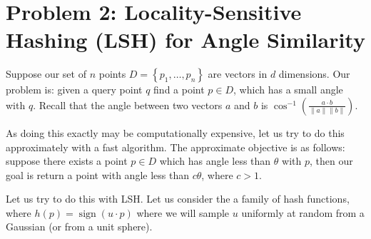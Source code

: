 \section*{Problem 2: Locality-Sensitive Hashing (LSH) for Angle Similarity}

Suppose our set of $n$ points $D = \left\{p_1,\ldots,p_n\right\}$ are vectors in
$d$ dimensions. Our problem is: given a query point $q$ find a point $p \in D$,
which has a small angle with $q$. Recall that the angle between two vectors $a$
and $b$ is
$\cos^{-1}\left(\frac{a \cdot b}{\lVert a \rVert \lVert b \rVert} \right).$

As doing this exactly may be computationally expensive, let us try to do this
approximately with a fast algorithm. The approximate objective is as follows:
suppose there exists a point $p \in D$ which has angle less than $\theta$ with
$p$, then our goal is return a point with angle less than $c\theta$, where
$c > 1$.

Let us try to do this with LSH. Let us consider the a family of hash functions,
where $h(p) = \operatorname{sign}\left(u \cdot p\right)$ where we will sample
$u$ uniformly at random from a Gaussian (or from a unit sphere).

